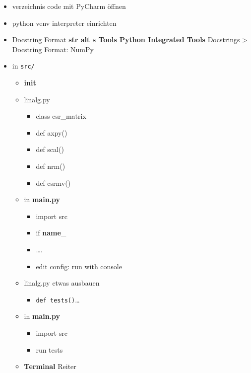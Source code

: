 \begin{itemize}
\item
  verzeichnis code mit PyCharm öffnen
\item
  python venv interpreter einrichten
\item
  Docstring Format \textbf{str alt s \textbar{} Tools \textbar{} Python
  Integrated Tools} \textbar{} Docstrings \textgreater{} Docstring
  Format: NumPy
\item
  in \texttt{src/}

  \begin{itemize}
  \item
    \textbf{init}
  \item
    linalg.py

    \begin{itemize}
    \tightlist
    \item
      class csr\_matrix
    \item
      def axpy()
    \item
      def scal()
    \item
      def nrm()
    \item
      def csrmv()
    \end{itemize}
  \item
    in \textbf{main.py}

    \begin{itemize}
    \tightlist
    \item
      import src
    \item
      if \textbf{name}\_
    \item
      \ldots{}.
    \item
      edit config: run with console
    \end{itemize}
  \item
    linalg.py etwas ausbauen

    \begin{itemize}
    \tightlist
    \item
      \texttt{def\ tests()}\ldots{}
    \end{itemize}
  \item
    in \textbf{main.py}

    \begin{itemize}
    \tightlist
    \item
      import src
    \item
      run tests
    \end{itemize}
  \item
    \textbf{Terminal} Reiter


\end{itemize}
\end{itemize}
